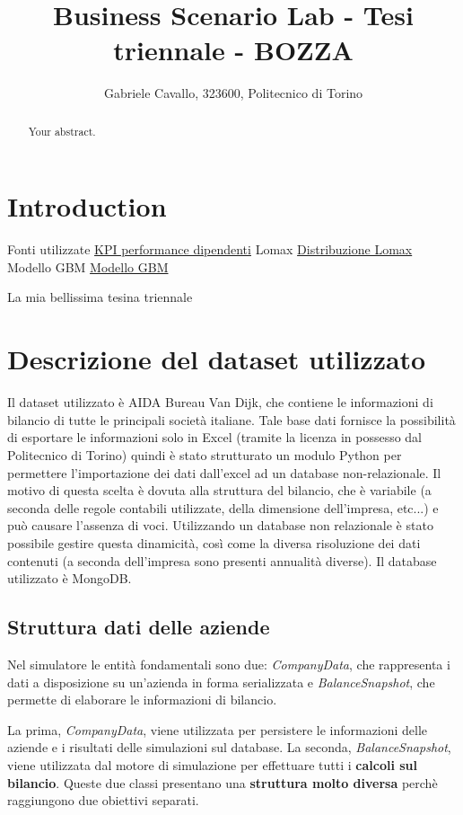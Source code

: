 \documentclass{article}
\title{Business Scenario Lab - Tesi triennale - BOZZA}
\author{Gabriele Cavallo, 323600, Politecnico di Torino}
\begin{document}
\maketitle

\begin{abstract}
Your abstract.
\end{abstract}

\section{Introduction}
Fonti utilizzate \href{https://www.agile-hr-analytics.com/hr-performance-kpis-guide/}{KPI performance dipendenti}
Lomax \href{https://en.wikipedia.org/wiki/Lomax_distribution}{Distribuzione Lomax}
Modello GBM \href{https://www.simtrade.fr/blog_simtrade/modeling-asset-prices-financial-markets-arithmetic-geometric-brownian-motions/}{Modello GBM}

La mia bellissima tesina triennale

\tableofcontents
\section{Descrizione del dataset utilizzato}
Il dataset utilizzato è AIDA Bureau Van Dijk, che contiene le informazioni di bilancio di tutte le principali società italiane. Tale base dati fornisce la possibilità di esportare le informazioni solo in Excel (tramite la licenza in possesso dal Politecnico di Torino) quindi è stato strutturato un modulo Python per permettere l'importazione dei dati dall'excel ad un database non-relazionale. 
Il motivo di questa scelta è dovuta alla struttura del bilancio, che è variabile (a seconda delle regole contabili utilizzate, della dimensione dell'impresa, etc...) e può causare l'assenza di voci. 
Utilizzando un database non relazionale è stato possibile gestire questa dinamicità, così come la diversa risoluzione dei dati contenuti (a seconda dell'impresa sono presenti annualità diverse). 
Il database utilizzato è MongoDB.  

\subsection{Struttura dati delle aziende}
Nel simulatore le entità fondamentali sono due: \textit{CompanyData}, che rappresenta i dati a disposizione su un'azienda in forma serializzata e \textit{BalanceSnapshot}, che permette di elaborare le informazioni di bilancio. 

La prima, \textit{CompanyData}, viene utilizzata per persistere le informazioni delle aziende e i risultati delle simulazioni sul database. 
La seconda, \textit{BalanceSnapshot}, viene utilizzata dal motore di simulazione per effettuare tutti i \textbf{calcoli sul bilancio}. 
Queste due classi presentano una \textbf{struttura molto diversa} perchè raggiungono due obiettivi separati. 
\end{document}
